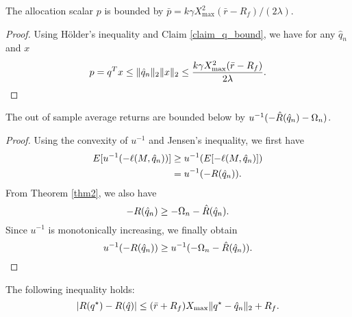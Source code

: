 \begin{claim}
  \label{claim_p_bound}
  The allocation scalar $p$ is bounded by $\bar p = k\gamma X_{\max}^2(\bar r- R_f)/(2\lambda)$.
\end{claim}
\begin{proof}
  Using Hölder's inequality and Claim \ref{claim_q_bound}, we have for any $\hat q_n$ and
  $x$
  \begin{equation*}
    p = q^Tx \leq \|\hat q_n\|_2 \|x\|_2 \leq \frac{k\gamma X_{\max}^2(\bar
      r-R_f)}{2\lambda}.\qedhere
  \end{equation*}
\end{proof}

\begin{claim}
  \label{out_of_sample_claim}
  The out of sample average returns are bounded below by $u^{-1}(-\hat R({\hat q}_n) - \Omega_n)$.
\end{claim}
\begin{proof}
  Using the convexity of $u^{-1}$ and Jensen's inequality, we first have
  \begin{align*}
    E[u^{-1}(-\ell(M,{\hat q}_n))] &\geq u^{-1}(E[-\ell(M,{\hat q}_n)])\\
                                &=u^{-1}(-R({\hat q}_n)).
  \end{align*}
  From Theorem \ref{thm2}, we also have 
  \begin{equation*}
    -R({\hat q}_n) \geq -\Omega_n - \hat R({\hat q}_n).
  \end{equation*}
  Since $u^{-1}$ is monotonically increasing, we finally obtain
  \begin{equation*}
    u^{-1}(-R({\hat q}_n)) \geq u^{-1}(-\Omega_n - \hat R({\hat q}_n)).\qedhere
  \end{equation*}
\end{proof}


\begin{claim}
\label{claim1}
 The following inequality holds:
\begin{equation*}
  |R({q^\star}) - R(\hat q)| \leq (\bar r +R_f)X_{\max}\|{q^\star} - {\hat q}_n\|_2 + R_f.
\end{equation*}
\end{claim}

